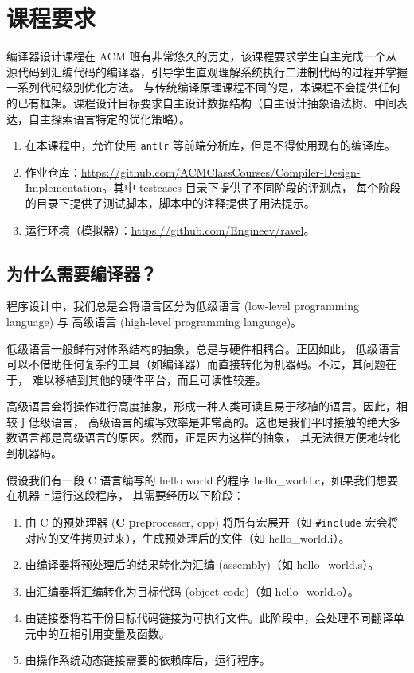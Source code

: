 \chapter{课程要求}

编译器设计课程在 ACM 班有非常悠久的历史，该课程要求学生自主完成一个从源代码到汇编代码的编译器，引导学生直观理解系统执行二进制代码的过程并掌握一系列代码级别优化方法。
与传统编译原理课程不同的是，本课程不会提供任何的已有框架。课程设计目标要求自主设计数据结构（自主设计抽象语法树、中间表达，自主探索语言特定的优化策略）。

\begin{remark}
  \begin{enumerate}
    \item 在本课程中，允许使用 \texttt{antlr} 等前端分析库，但是不得使用现有的编译库。
    \item 作业仓库：\url{https://github.com/ACMClassCourses/Compiler-Design-Implementation}。其中 testcases 目录下提供了不同阶段的评测点，
      每个阶段的目录下提供了测试脚本，脚本中的注释提供了用法提示。
    \item 运行环境（模拟器）：\url{https://github.com/Engineev/ravel}。
  \end{enumerate}
\end{remark}

\section{为什么需要编译器？}

程序设计中，我们总是会将语言区分为低级语言 (low-level programming language) 与
高级语言 (high-level programming language)。

低级语言一般鲜有对体系结构的抽象，总是与硬件相耦合。正因如此，
低级语言可以不借助任何复杂的工具（如编译器）而直接转化为机器码。不过，其问题在于，
难以移植到其他的硬件平台，而且可读性较差。

高级语言会将操作进行高度抽象，形成一种人类可读且易于移植的语言。因此，相较于低级语言，
高级语言的编写效率是非常高的。这也是我们平时接触的绝大多数语言都是高级语言的原因。然而，正是因为这样的抽象，
其无法很方便地转化到机器码。

假设我们有一段 C 语言编写的 hello world 的程序 hello\_world.c，如果我们想要在机器上运行这段程序，
其需要经历以下阶段：
\begin{enumerate}
  \item 由 C 的预处理器 (\textbf{C} \textbf{p}re\textbf{p}rocesser, cpp)
    将所有宏展开（如 \texttt{\#include} 宏会将对应的文件拷贝过来），生成预处理后的文件（如 hello\_world.i）。
  \item 由编译器将预处理后的结果转化为汇编 (assembly)（如 hello\_world.s）。
  \item 由汇编器将汇编转化为目标代码 (object code)（如 hello\_world.o）。
  \item 由链接器将若干份目标代码链接为可执行文件。此阶段中，会处理不同翻译单元中的互相引用变量及函数。
  \item 由操作系统动态链接需要的依赖库后，运行程序。
\end{enumerate}

